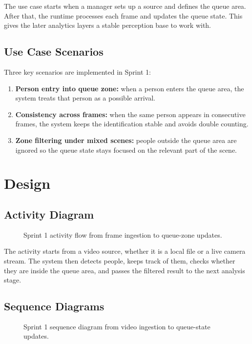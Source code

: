 The use case starts when a manager sets up a source and defines the queue area. After that, the runtime processes each frame and updates the queue state. This gives the later analytics layers a stable perception base to work with.

\subsection{Use Case Scenarios}
Three key scenarios are implemented in Sprint 1:
\begin{enumerate}
    \item \textbf{Person entry into queue zone:} when a person enters the queue area, the system treats that person as a possible arrival.
    \item \textbf{Consistency across frames:} when the same person appears in consecutive frames, the system keeps the identification stable and avoids double counting.
    \item \textbf{Zone filtering under mixed scenes:} people outside the queue area are ignored so the queue state stays focused on the relevant part of the scene.
\end{enumerate}

\section{Design}

\subsection{Activity Diagram}
\begin{figure}[H]
    \centering
    \caption{Sprint 1 activity flow from frame ingestion to queue-zone updates.}
    \label{fig:sprint1_activity}
\end{figure}

The activity starts from a video source, whether it is a local file or a live camera stream. The system then detects people, keeps track of them, checks whether they are inside the queue area, and passes the filtered result to the next analysis stage.

\subsection{Sequence Diagrams}
\begin{figure}[H]
    \centering
    \caption{Sprint 1 sequence diagram from video ingestion to queue-state updates.}
    \label{fig:sprint1_sequence}
\end{figure}

